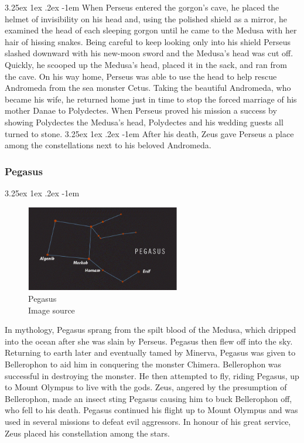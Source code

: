 \documentclass[a4paper,twoside,11pt]{article}
\makeatletter
\numberwithin{equation}{section}
\renewcommand\paragraph{\@startsection{paragraph}{5}{\z@}%
  {3.25ex \@plus1ex \@minus.2ex}%
  {-1em}%
  {\normalfont\normalsize\bfseries}}
\makeatother
\begin{document}
\paragraph{}
When Perseus entered the gorgon’s cave, he placed the helmet of invisibility on his head and, using the polished shield as a mirror, he examined the head of each sleeping gorgon until he came to the Medusa with her hair of hissing snakes. Being careful to keep looking only into his shield Perseus slashed downward with his new-moon sword and the Medusa’s head was cut off. Quickly, he scooped up the Medusa’s head, placed it in the sack, and ran from the cave. On his way home, Perseus was able to use the head to help rescue Andromeda from the sea monster Cetus. Taking the beautiful Andromeda, who became his wife, he returned home just in time to stop the forced marriage of his mother Danae to Polydectes. When Perseus proved his mission a success by showing Polydectes the Medusa’s head, Polydectes and his wedding guests all turned to stone.
\paragraph{}
After his death, Zeus gave Perseus a place among the constellations next to his beloved Andromeda.

\subsubsection{Pegasus}
\paragraph{}
\begin{figure}[h]
\centering
\includegraphics[width=0.6\textwidth]{fig18.jpg}
\caption{Pegasus \\ Image source \cite{Pegasi}}
\label{fig18}
\end{figure}
In mythology, Pegasus sprang from the spilt blood of the Medusa, which dripped into the ocean after she was slain by Perseus. Pegasus then flew off into the sky. Returning to earth later and eventually tamed by Minerva, Pegasus was given to Bellerophon to aid him in conquering the monster Chimera. Bellerophon was successful in destroying the monster. He then attempted to fly, riding Pegasus, up to Mount Olympus to live with the gods. Zeus, angered by the presumption of Bellerophon, made an insect sting Pegasus causing him to buck Bellerophon off, who fell to his death. Pegasus continued his flight up to Mount Olympus and was used in several missions to defeat evil aggressors. In honour of his great service, Zeus placed his constellation among the stars.
\end{document}
